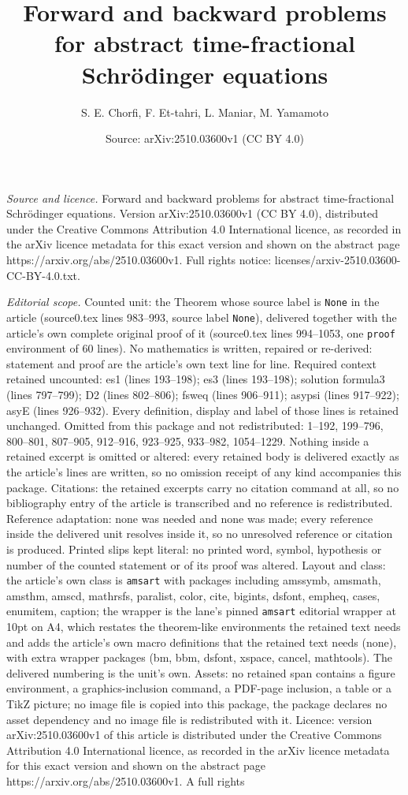 \documentclass[10pt,a4paper]{amsart}
\title[Forward and backward problems for abstract time-fractional S]{Forward and backward problems for abstract time-fractional Schr\"odinger equations}
\author{S. E. Chorfi, F. Et-tahri, L. Maniar, M. Yamamoto}
\date{Source: arXiv:2510.03600v1 (CC BY 4.0)}
\begin{document}
\maketitle

\noindent\emph{Source and licence.} Forward and backward problems for abstract time-fractional Schr\"odinger equations. Version arXiv:2510.03600v1 (CC BY 4.0), distributed under the Creative Commons Attribution 4.0 International licence, as recorded in the arXiv licence metadata for this exact version and shown on the abstract page https://arxiv.org/abs/2510.03600v1. Full rights notice: licenses/arxiv-2510.03600-CC-BY-4.0.txt.\par\smallskip

\noindent\textit{Editorial scope.} Counted unit: the Theorem whose source label is \texttt{None} in the article (source0.tex lines 983--993, source label \texttt{None}), delivered together with the article's own complete original proof of it (source0.tex lines 994--1053, one \texttt{proof} environment of 60 lines). No mathematics is written, repaired or re-derived: statement and proof are the article's own text line for line. Required context retained uncounted: es1 (lines 193--198); es3 (lines 193--198); solution formula3 (lines 797--799); D2 (lines 802--806); fsweq (lines 906--911); asypsi (lines 917--922); asyE (lines 926--932). Every definition, display and label of those lines is retained unchanged. Omitted from this package and not redistributed: 1--192, 199--796, 800--801, 807--905, 912--916, 923--925, 933--982, 1054--1229. Nothing inside a retained excerpt is omitted or altered: every retained body is delivered exactly as the article's lines are written, so no omission receipt of any kind accompanies this package. Citations: the retained excerpts carry no citation command at all, so no bibliography entry of the article is transcribed and no reference is redistributed. Reference adaptation: none was needed and none was made; every reference inside the delivered unit resolves inside it, so no unresolved reference or citation is produced. Printed slips kept literal: no printed word, symbol, hypothesis or number of the counted statement or of its proof was altered. Layout and class: the article's own class is \texttt{amsart} with packages including amssymb, amsmath, amsthm, amscd, mathrsfs, paralist, color, cite, bigints, dsfont, empheq, cases, enumitem, caption; the wrapper is the lane's pinned \texttt{amsart} editorial wrapper at 10pt on A4, which restates the theorem-like environments the retained text needs and adds the article's own macro definitions that the retained text needs (none), with extra wrapper packages (bm, bbm, dsfont, xspace, cancel, mathtools). The delivered numbering is the unit's own. Assets: no retained span contains a figure environment, a graphics-inclusion command, a PDF-page inclusion, a table or a TikZ picture; no image file is copied into this package, the package declares no asset dependency and no image file is redistributed with it. Licence: version arXiv:2510.03600v1 of this article is distributed under the Creative Commons Attribution 4.0 International licence, as recorded in the arXiv licence metadata for this exact version and shown on the abstract page https://arxiv.org/abs/2510.03600v1. A full rights 
\end{document}

